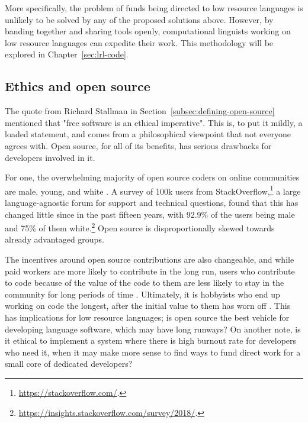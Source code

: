 More specifically, the problem of funds being directed to low resource languages is unlikely to be solved by any of the proposed solutions above. However, by banding together and sharing tools openly, computational linguists working on low resource languages can expedite their work. This methodology will be explored in Chapter~\ref{sec:lrl-code}.

\subsection{Ethics and open source}
\label{subsec:oss-ethics}

The quote from Richard Stallman in Section~\ref{subsec:defining-open-source} mentioned that "free software is an ethical imperative". This is, to put it mildly, a loaded statement, and comes from a philosophical viewpoint that not everyone agrees with. Open source, for all of its benefits, has serious drawbacks for developers involved in it.

For one, the overwhelming majority of open source coders on online communities are male, young, and white \citep{ghosh2002free}. A survey of 100k users from StackOverflow,\footnote{\href{https://stackoverflow.com/}{https://stackoverflow.com/}. } a large language-agnostic forum for support and technical questions, found that this has changed little since in the past fifteen years, with 92.9\% of the users being male and 75\% of them white.\footnote{\href{https://insights.stackoverflow.com/survey/2018/}{https://insights.stackoverflow.com/survey/2018/}. } Open source is disproportionally skewed towards already advantaged groups.

The incentives around open source contributions are also changeable, and while paid workers are more likely to contribute in the long run, users who contribute to code because of the value of the code to them are less likely to stay in the community for long periods of time \citep{roberts2006understanding, shah2006motivation}. Ultimately, it is hobbyists who end up working on code the longest, after the initial value to them has worn off \citep{shah2006motivation}. This has implications for low resource languages; is open source the best vehicle for developing language software, which may have long runways? On another note, is it ethical to implement a system where there is high burnout rate for developers who need it, when it may make more sense to find ways to fund direct work for a small core of dedicated developers?

